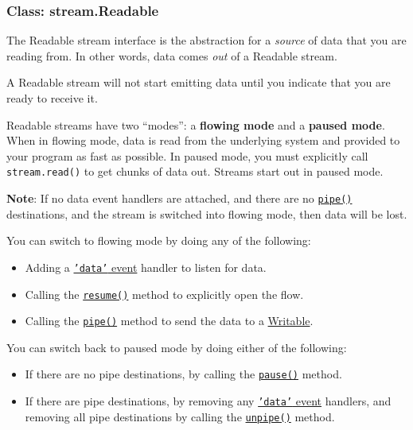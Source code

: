 \subsubsection{Class: stream.Readable}\label{class-stream.readable}

The Readable stream interface is the abstraction for a \emph{source} of
data that you are reading from. In other words, data comes \emph{out} of
a Readable stream.

A Readable stream will not start emitting data until you indicate that
you are ready to receive it.

Readable streams have two ``modes'': a \textbf{flowing mode} and a
\textbf{paused mode}. When in flowing mode, data is read from the
underlying system and provided to your program as fast as possible. In
paused mode, you must explicitly call \texttt{stream.read()} to get
chunks of data out. Streams start out in paused mode.

\textbf{Note}: If no data event handlers are attached, and there are no
\hyperref[streamux5freadableux5fpipeux5fdestinationux5foptions]{\texttt{pipe()}}
destinations, and the stream is switched into flowing mode, then data
will be lost.

You can switch to flowing mode by doing any of the following:

\begin{itemize}
\itemsep1pt\parskip0pt
\item
  Adding a \hyperref[streamux5feventux5fdata]{\texttt{'data'} event}
  handler to listen for data.
\item
  Calling the \hyperref[streamux5freadableux5fresume]{\texttt{resume()}}
  method to explicitly open the flow.
\item
  Calling the
  \hyperref[streamux5freadableux5fpipeux5fdestinationux5foptions]{\texttt{pipe()}}
  method to send the data to a
  \hyperref[streamux5fclassux5fstreamux5fwritable]{Writable}.
\end{itemize}

You can switch back to paused mode by doing either of the following:

\begin{itemize}
\itemsep1pt\parskip0pt
\item
  If there are no pipe destinations, by calling the
  \hyperref[streamux5freadableux5fpause]{\texttt{pause()}} method.
\item
  If there are pipe destinations, by removing any
  \hyperref[streamux5feventux5fdata]{\texttt{'data'} event} handlers,
  and removing all pipe destinations by calling the
  \hyperref[streamux5freadableux5funpipeux5fdestination]{\texttt{unpipe()}}
  method.
\end{itemize}

